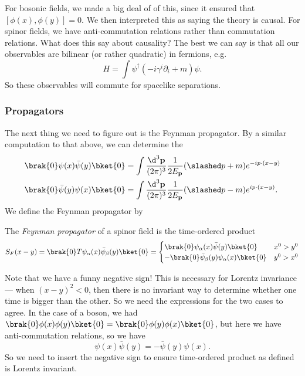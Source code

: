 \documentclass[a4paper]{article}
\begin{document}
For bosonic fields, we made a big deal of of this, since it ensured that $[\phi(x), \phi(y)] = 0$. We then interpreted this as saying the theory is causal. For spinor fields, we have anti-commutation relations rather than commutation relations. What does this say about causality? The best we can say is that all our observables are bilinear (or rather quadratic) in fermions, e.g.
\[
  H = \int \psi^\dagger (-i \gamma^i \partial_i + m) \psi.
\]
So these observables will commute for spacelike separations.


\subsubsection*{Propagators}
The next thing we need to figure out is the Feynman propagator. By a similar computation to that above, we can determine the 
\begin{align*}
  \brak{0} \psi(x) \bar\psi(y)\bket{0} &= \int \frac{\d^3 \mathbf{p}}{(2\pi)^3} \frac{1}{2E_\mathbf{p}}(\slashed p + m) e^{-ip\cdot (x - y)}\\
  \brak{0} \bar\psi(y) \psi(x)\bket{0} &= \int \frac{\d^3 \mathbf{p}}{(2\pi)^3} \frac{1}{2E_\mathbf{p}}(\slashed p - m) e^{ip\cdot (x - y)}.
\end{align*}
We define the Feynman propagator by
\begin{defi}
  The \emph{Feynman propagator} of a spinor field is the time-ordered product
  \[
    S_F(x - y) = \brak{0} T \psi_\alpha(x) \bar\psi_\beta(y)\bket{0} =
    \begin{cases}
      \brak{0}\psi_\alpha(x) \bar\psi(y)\bket{0} & x^0 > y^0\\
      -\brak{0} \bar\psi_\beta(y) \psi_\alpha(x) \bket{0} & y^0 > x^0
    \end{cases}
  \]
\end{defi}
Note that we have a funny negative sign! This is necessary for Lorentz invariance --- when $(x - y)^2 < 0$, then there is no invariant way to determine whether one time is bigger than the other. So we need the expressions for the two cases to agree. In the case of a boson, we had $\brak{0}\phi(x) \phi(y) \bket{0} = \brak{0} \phi(y) \phi(x)\bket{0}$, but here we have anti-commutation relations, so we have
\[
  \psi(x) \bar\psi(y) = - \bar\psi (y) \psi(x).
\]
So we need to insert the negative sign to ensure time-ordered product as defined is Lorentz invariant.
\end{document}

